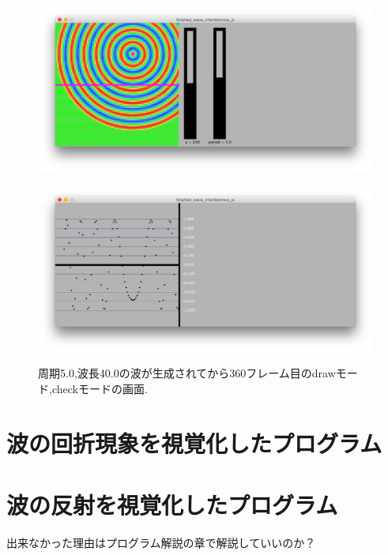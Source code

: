 \begin{figure}[htbp]
\begin{minipage}[b]{1.0\linewidth}
\centering
\includegraphics[keepaspectratio, scale=0.40]
  {../result/drawmode.png}
 \label{drawmode}
 \end{minipage}
 
\begin{minipage}[b]{1.0\linewidth}
\centering
  \includegraphics[keepaspectratio, scale=0.40]
  {../result/checkmode.png}
 \label{checkmode}
 \end{minipage}
  
  \caption{周期5.0,波長40.0の波が生成されてから360フレーム目のdrawモード,checkモードの画面.}
 \label{fig:compare}
\end{figure}



\newpage
\section{波の回折現象を視覚化したプログラム}
\section{波の反射を視覚化したプログラム}
出来なかった理由はプログラム解説の章で解説していいのか？
